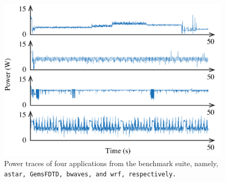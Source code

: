 \begin{figure}
  \centering
  \includegraphics[width=1.0\columnwidth]{include/assets/figures/workload.pdf}
  \caption{
    Power traces of four applications from the  benchmark
    suite, namely, \tt{astar}, \tt{GemsFDTD}, \tt{bwaves}, and \tt{wrf},
    respectively.
  }
\end{figure}
